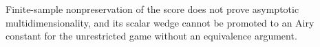 Finite-sample nonpreservation of the score does not prove asymptotic multidimensionality, and its scalar wedge cannot be promoted to an Airy constant for the unrestricted game without an equivalence argument.